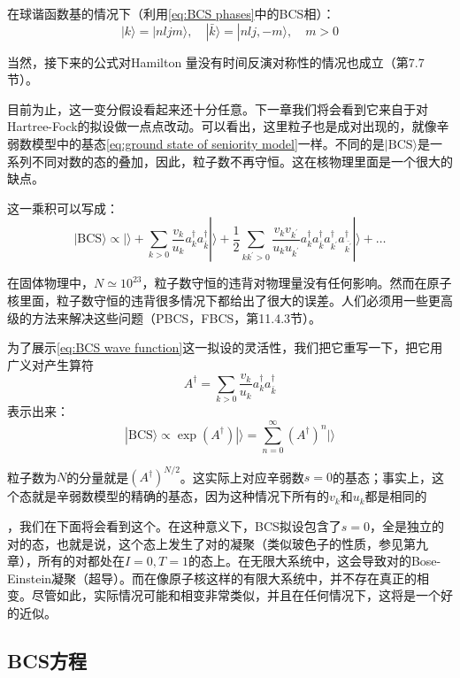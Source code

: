 在球谐函数基的情况下（利用\ref{eq:BCS phases}中的BCS相）：
\begin{equation}
|k\rangle=|nljm\rangle,\quad|\bar{k}\rangle=|nlj,-m\rangle,\quad m>0\label{eq:conj state}
\end{equation}

当然，接下来的公式对Hamilton 量没有时间反演对称性的情况也成立（第7.7节）。

目前为止，这一变分假设看起来还十分任意。下一章我们将会看到它来自于对Hartree-Fock的拟设做一点点改动。可以看出，这里粒子也是成对出现的，就像辛弱数模型中的基态\ref{eq:ground state of seniority model}一样。不同的是$|\text{BCS}\rangle$是一系列不同对数的态的叠加，因此，粒子数不再守恒。这在核物理里面是一个很大的缺点。

这一乘积可以写成：
\begin{equation}
|\text{BCS}\rangle\propto|\rangle+\sum_{k>0}\frac{v_{k}}{u_{k}}a^{\dagger}_{k}a^{\dagger}_{\bar{k}}|\rangle+\frac{1}{2}\sum_{kk^{\prime}>0}\frac{v_{k}v_{k^{\prime}}}{u_{k}u_{k^{\prime}}}a^{\dagger}_{k}a^{\dagger}_{\bar{k}}a^{\dagger}_{k^{\prime}}a^{\dagger}_{\bar{k^{\prime}}}|\rangle+\dots\label{eq:BCS wave function sum form}
\end{equation}

在固体物理中，$N\simeq10^{23}$，粒子数守恒的违背对物理量没有任何影响。然而在原子核里面，粒子数守恒的违背很多情况下都给出了很大的误差。人们必须用一些更高级的方法来解决这些问题（PBCS，FBCS，第11.4.3节）。

为了展示\ref{eq:BCS wave function}这一拟设的灵活性，我们把它重写一下，把它用广义对产生算符
\[
A^{\dagger}=\sum_{k>0}\frac{v_{k}}{u_{k}}a^{\dagger}_{k}a^{\dagger}_{\bar{k}}
\]
表示出来：
\[
|\text{BCS}\rangle\propto\exp\left(A^{\dagger}\right)|\rangle=\sum^{\infty}_{n=0}(A^{\dagger})^{n}|\rangle
\]

粒子数为$N$的分量就是$(A^{\dagger})^{N/2}$。这实际上对应辛弱数$s=0$的基态；事实上，这个态就是辛弱数模型的精确的基态，因为这种情况下所有的$v_{k}$和$u_{k}$都是相同的

，我们在下面将会看到这个。在这种意义下，BCS拟设包含了$s=0$，全是独立的对的态，也就是说，这个态上发生了对的凝聚（类似玻色子的性质，参见第九章），所有的对都处在$I=0,T=1$的态上。在无限大系统中，这会导致对的Bose-Einstein凝聚（超导）。而在像原子核这样的有限大系统中，并不存在真正的相变。尽管如此，实际情况可能和相变非常类似，并且在任何情况下，这将是一个好的近似。

\subsection{BCS方程\label{subsec:BCS=0065B9=007A0B}}

